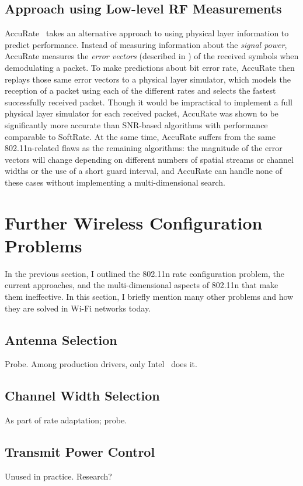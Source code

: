 \subsection{Approach using Low-level RF Measurements}
\label{sec:accurate}
AccuRate~\cite{Sen_AccuRate} takes an alternative approach to using physical layer information to predict performance. Instead of measuring information about the \emph{signal power}, AccuRate measures the \emph{error vectors} (described in ) of the received symbols when demodulating a packet. To make predictions about bit error rate, AccuRate then replays those same error vectors to a physical layer simulator, which models the reception of a packet using each of the different rates and selects the fastest successfully received packet. Though it would be impractical to implement a full physical layer simulator for each received packet, AccuRate was shown to be significantly more accurate than SNR-based algorithms with performance comparable to SoftRate. At the same time, AccuRate suffers from the same 802.11n-related flaws as the remaining algorithms: the magnitude of the error vectors will change depending on different numbers of spatial streams or channel widths or the use of a short guard interval, and AccuRate can handle none of these cases without implementing a multi-dimensional search.

\section{Further Wireless Configuration Problems}
In the previous section, I outlined the 802.11n rate configuration problem, the current approaches, and the multi-dimensional aspects of 802.11n that make them ineffective. In this section, I briefly mention many other problems and how they are solved in Wi-Fi networks today.

\subsection{Antenna Selection}
Probe. Among production drivers, only Intel~\cite{iwlwifi} does it.
\subsection{Channel Width Selection}
As part of rate adaptation; probe.
\subsection{Transmit Power Control}
Unused in practice. Research?
